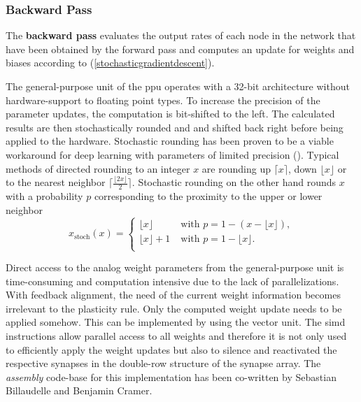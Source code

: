 \subsubsection*{Backward Pass}
The \textbf{backward pass} evaluates the output rates of each node in the network that have been obtained by the forward pass and computes an update for weights and biases according to  (\cref{stochasticgradientdescent}).

The general-purpose unit of the \gls{ppu} operates with a 32-bit architecture without hardware-support to floating point types. To increase the precision of the parameter updates, the computation is bit-shifted to the left. The calculated results are then stochastically rounded and and shifted back right before being applied to the hardware. Stochastic rounding has been proven to be a viable workaround for deep learning with parameters of limited precision (\citealp{limitedprecisionpaper}). Typical methods of directed rounding to an integer $x$ are rounding up $\lceil x\rceil$, down $\lfloor x\rfloor$ or to the nearest neighbor $\lceil\frac{\lfloor2x\rfloor}{2}\rceil$. Stochastic rounding on the other hand rounds $x$ with a probability $p$ corresponding to the proximity to the upper or lower neighbor
\begin{equation*}
x_\text{stoch}(x) = 
\begin{cases}
\lfloor x \rfloor \quad \quad &\text{with } p = 1 - (x - \lfloor x \rfloor), \\
\lfloor x \rfloor + 1 &\text{with } p = 1 - \lfloor x \rfloor. \\
\end{cases}
\end{equation*}

Direct access to the analog weight parameters from the general-purpose unit is time-consuming and computation intensive due to the lack of parallelizations. With feedback alignment, the need of the current weight information becomes irrelevant to the plasticity rule. Only the computed weight update needs to be applied somehow. This can be implemented by using the vector unit. The \gls{simd} instructions allow parallel access to all weights and therefore it is not only used to efficiently apply the weight updates but also to silence and reactivated the respective synapses in the double-row structure of the synapse array. The \emph{assembly} code-base for this implementation has been co-written by Sebastian Billaudelle and Benjamin Cramer.

